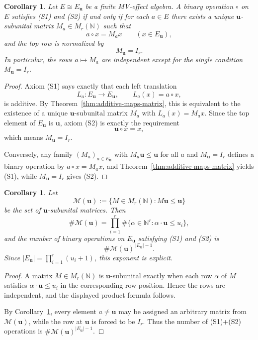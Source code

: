 \documentclass[11pt]{article}
\newtheorem{corollary}[theorem]{Corollary}
\theoremstyle{definition}
\theoremstyle{remark}
\numberwithin{equation}{section}
\newcommand{\NN}{\mathbb{N}}
\begin{document}
\begin{corollary}\label{cor:S1S2-classification-mv}
Let $E\cong E_{\mathbf u}$ be a finite MV-effect algebra. A binary operation $\circ$ on $E$ satisfies \textup{(S1)} and \textup{(S2)} if and only if for each $a\in E$ there exists a unique $\mathbf u$-subunital matrix $M_a\in M_r(\NN)$ such that
\[
a\circ x=M_a x
\qquad (x\in E_{\mathbf u}),
\]
and the top row is normalized by
\[
M_{\mathbf u}=I_r.
\]
In particular, the rows $a\mapsto M_a$ are independent except for the single condition $M_{\mathbf u}=I_r$.
\end{corollary}

\begin{proof}
Axiom \textup{(S1)} says exactly that each left translation
\[
L_a\colon E_{\mathbf u}\to E_{\mathbf u},\qquad L_a(x)=a\circ x,
\]
is additive. By Theorem~\ref{thm:additive-maps-matrix}, this is equivalent to the existence of a unique $\mathbf u$-subunital matrix $M_a$ with $L_a(x)=M_a x$. Since the top element of $E_{\mathbf u}$ is $\mathbf u$, axiom \textup{(S2)} is exactly the requirement
\[
\mathbf u\circ x=x,
\]
which means $M_{\mathbf u}=I_r$.

Conversely, any family $(M_a)_{a\in E_{\mathbf u}}$ with $M_a\mathbf u\le \mathbf u$ for all $a$ and $M_{\mathbf u}=I_r$ defines a binary operation by $a\circ x=M_a x$, and Theorem~\ref{thm:additive-maps-matrix} yields \textup{(S1)}, while $M_{\mathbf u}=I_r$ gives \textup{(S2)}.
\end{proof}

\begin{corollary}\label{cor:counting-general}
Let
\[
\mathcal M(\mathbf u):=\{M\in M_r(\NN): M\mathbf u\le \mathbf u\}
\]
be the set of $\mathbf u$-subunital matrices. Then
\[
\#\mathcal M(\mathbf u)=\prod_{i=1}^r \#\bigl\{\alpha\in\NN^r: \alpha\cdot \mathbf u\le u_i\bigr\},
\]
and the number of binary operations on $E_{\mathbf u}$ satisfying \textup{(S1)} and \textup{(S2)} is
\[
\#\mathcal M(\mathbf u)^{\,|E_{\mathbf u}|-1}.
\]
Since $|E_{\mathbf u}|=\prod_{i=1}^r (u_i+1)$, this exponent is explicit.
\end{corollary}

\begin{proof}
A matrix $M\in M_r(\NN)$ is $\mathbf u$-subunital exactly when each row $\alpha$ of $M$ satisfies $\alpha\cdot \mathbf u\le u_i$ in the corresponding row position. Hence the rows are independent, and the displayed product formula follows.

By Corollary~\ref{cor:S1S2-classification-mv}, every element $a\neq \mathbf u$ may be assigned an arbitrary matrix from $\mathcal M(\mathbf u)$, while the row at $\mathbf u$ is forced to be $I_r$. Thus the number of \textup{(S1)}+\textup{(S2)} operations is $\#\mathcal M(\mathbf u)^{|E_{\mathbf u}|-1}$.
\end{proof}
\end{document}
